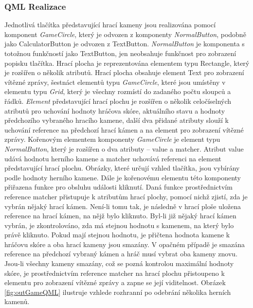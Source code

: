 \documentclass[11pt,twoside,a4paper]{book}
\begin{document}
{{\begin{ttemize}
{{\begin{lastlisting}[frame=single,caption=Řešení v pseudokódu problematického použití operátoru "." v přiřazovacím výroku,label=lst:var0N]
\subsubsection{QML Realizace}
Jednotlivá tlačítka představující hrací kameny jsou realizována pomocí komponent \textit{GameCircle}, který je odvozen z komponenty \textit{NormalButton}, podobně jako CalculatorButton je odvozen z TextButton. \textit{NormalButton} je komponenta s totožnou funkčností jako TextButton, jen neobsahuje funkčnost pro zobrazení popisku tlačítka.
Hrací plocha je reprezentována elementem typu Rectangle, který je rozšířen o několik atributů. Hrací plocha obsahuje element Text pro zobrazení vítězné zprávy, šestnáct elementů typu \textit{GameCircle}, které jsou umístěny v elementu typu \textit{Grid}, který je všechny rozmístí do zadaného počtu sloupců a řádků. \textit{Element} představující hrací plochu je rozšířen o několik celočíselných atributů pro uchování hodnoty hráčova skóre, aktuálního stavu a hodnoty předchozího vybraného hracího kamene, další dva přidané atributy slouží k uchování reference na předchozí hrací kámen a na element pro zobrazení vítězné zprávy.
Kořenovým elementem komponenty \textit{GameCircle} je element typu \textit{NormalButton}, který je rozšířen o dva atributy – value a matcher. Atribut value udává hodnotu herního kamene a matcher uchovává referenci na element představující hrací plochu. Obrázky, které určují vzhled tlačítka, jsou vybírány podle hodnoty herního kamene. Dále je kořenovému elementu této komponenty přiřazena funkce pro obsluhu události kliknutí. Daná funkce prostřednictvím reference matcher přistupuje k atributům hrací plochy, pomocí nichž zjistí, zda je vybrán nějaký hrací kámen. Není-li tomu tak, je následně v hrací ploše uložena reference na hrací kámen, na nějž bylo kliknuto. Byl-li již nějaký hrací kámen vybrán, je zkontrolováno, zda má stejnou hodnotu s kamenem, na který bylo právě kliknuto. Pokud mají stejnou hodnotu, je přičtena hodnota kamene k hráčovu skóre a oba hrací kameny jsou smazány. V opačném případě je smazána reference na předchozí vybraný kámen a hráč musí vybrat oba kameny znovu. Jsou-li všechny kameny smazány, což se pozná kontrolou maximální hodnoty skóre, je prostřednictvím reference matcher na hrací plochu přistoupeno k elementu pro zobrazení vítězné zprávy a zapne se její viditelnost. Obrázek \ref{fig:outGameQML} ilustruje vzhlede rozhranní po odebrání několika herních kamenů.
\begin{figure}[!ht]
\begin{center}

\end{center}
\end{figure}
\end{lastlisting}}}
\end{ttemize}}}
\end{document}

